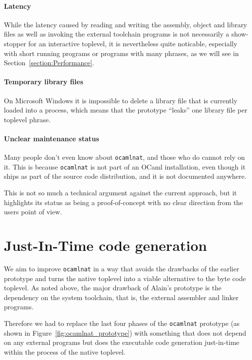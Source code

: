 \documentclass[10pt,a4paper,draft,twocolumn]{article}
\begin{document}
\paragraph{Latency}

While the latency caused by reading and writing the assembly, object and library files as well as invoking the
external toolchain programs is not necessarily a show-stopper for an interactive toplevel, it is nevertheless
quite noticable, especially with short running programs or programs with many phrases, as we will see in
Section~\ref{section:Performance}.

\paragraph{Temporary library files}

On Microsoft Windows it is impossible to delete a library file that is currently loaded into a process, which
means that the prototype ``leaks'' one library file per toplevel phrase.

\paragraph{Unclear maintenance status}

Many people don't even know about \texttt{ocamlnat}, and those who do cannot rely on it. This is because
\texttt{ocamlnat} is not part of an OCaml installation, even though it ships as part of the source code
distribution, and it is not documented anywhere.

This is not so much a technical argument against the current approach, but it highlights its status as
being a proof-of-concept with no clear direction from the users point of view.


\section{Just-In-Time code generation} \label{section:Just_In_Time_code_generation}

We aim to improve \texttt{ocamlnat} in a way that avoids the drawbacks of the earlier prototype
and turns the native toplevel into a viable alternative to the byte code toplevel. As noted above,
the major drawback of Alain's prototype is the dependency on the system toolchain, that is, the
external assembler and linker programs.

Therefore we had to replace the last four phases of the \texttt{ocamlnat} prototype (as shown in
Figure~\ref{fig:ocamlnat_prototype}) with something that does not depend on any external programs
but does the executable code generation just-in-time within the process of the native toplevel.
\end{document}
